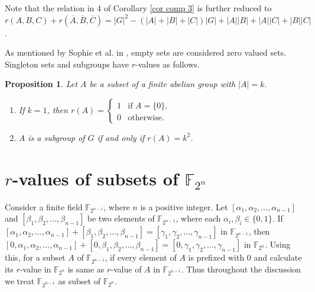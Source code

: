 \documentclass[12pt,a4paper]{article}
\newtheorem{prop}{Proposition}[section]
\begin{document}
	Note that the relation in 4 of Corollary \ref{cor comp 3} is further reduced to $r(A,B,C)+r(\overline{A},\overline{B},\overline{C})=|G|^2-(|A|+|B|+|C|)|G|+|A||B|+|A||C|+|B||C|$. 
	
	As mentioned by Sophie et al. in \cite{HUCZYNSKA2009831}, empty sets are considered zero valued sets.  Singleton sets and subgroups have $r$-values as follows.
	
	\begin{prop}\label{size 1}
		\cite{HUCZYNSKA2009831} Let $A$ be a subset of a finite abelian group with $|A|=k$.
		\begin{enumerate}
			\item If $k=1$, then $r(A)=\begin{cases}
				1 & \text{if } A=\{0\},\\
				0& \text{otherwise.}
			\end{cases}$
			\item   $A$ is a subgroup of $G$ if and only if $r(A)=k^2$.
		\end{enumerate}
	\end{prop}
	
	
	\section{$r$-values of subsets of $\mathbb{F}_{2^n}$}\label{r 2_n}
	Consider a finite field $\mathbb{F}_{2^{n-1}}$, where $n$ is a positive integer. Let $[\alpha_1,\alpha_2,\dots,\alpha_{n-1}]$ and $[\beta_1,\beta_2,\dots,\beta_{n-1}]$ be two elements of $\mathbb{F}_{2^{n-1}}$, where each $\alpha_i,\beta_i\in\{0,1\}$. If $[\alpha_1,\alpha_2,\dots,\alpha_{n-1}]+[\beta_1,\beta_2,\dots,\beta_{n-1}]=[\gamma_1,\gamma_2,\dots,\gamma_{n-1}] $ in $\mathbb{F}_{2^{n-1}}$, then $[0, \alpha_1,\alpha_2,\dots,\alpha_{n-1}]+[0,\beta_1,\beta_2,\dots,\beta_{n-1}]=[0,\gamma_1,\gamma_2,\dots,\gamma_{n-1}] $ in $\mathbb{F}_{2^n}$. Using this, for a subset $A$ of $\mathbb{F}_{2^{n-1}}$, if every element of $A$ is prefixed with $0$ and calculate its $r$-value in $\mathbb{F}_{2^n}$ is same as $r$-value of $A$ in $\mathbb{F}_{2^{n-1}}$. Thus throughout the discussion we treat $\mathbb{F}_{2^{n-1}}$ as subset of $\mathbb{F}_{2^n}$.
	
	
\end{document}
